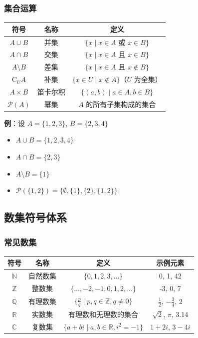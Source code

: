 \documentclass[12pt,a4paper,UTF8]{ctexart}
\begin{document}
\subsubsection{集合运算}

\begin{table}[ht]
\centering
\begin{tabular}{|c|c|c|}
\hline
符号 & 名称 & 定义 \\
\hline
$A \cup B$ & 并集 & $\{x \mid x \in A \text{ 或 } x \in B\}$ \\
\hline
$A \cap B$ & 交集 & $\{x \mid x \in A \text{ 且 } x \in B\}$ \\
\hline
$A \setminus B$ & 差集 & $\{x \mid x \in A \text{ 且 } x \notin B\}$ \\
\hline
$\mathrm{C}_U A$ & 补集 & $\{x \in U \mid x \notin A\}$（$U$ 为全集） \\
\hline
$A \times B$ & 笛卡尔积 & $\{(a,b) \mid a \in A, b \in B\}$ \\
\hline
$\mathcal{P}(A)$ & 幂集 & $A$ 的所有子集构成的集合 \\
\hline
\end{tabular}
\end{table}

\textbf{例}：设 $A = \{1,2,3\}$, $B = \{2,3,4\}$
\begin{itemize}
    \item $A \cup B = \{1,2,3,4\}$
    \item $A \cap B = \{2,3\}$
    \item $A \setminus B = \{1\}$
    \item $\mathcal{P}(\{1,2\}) = \{\emptyset, \{1\}, \{2\}, \{1,2\}\}$
\end{itemize}

\subsection{数集符号体系}

\subsubsection{常见数集}

\begin{table}[ht]
\centering
\begin{tabular}{|c|c|c|c|}
\hline
符号 & 名称 & 定义 & 示例元素 \\
\hline
$\mathbb{N}$ & 自然数集 & $\{0,1,2,3,\dots\}$ & 0, 1, 42 \\
\hline
$\mathbb{Z}$ & 整数集 & $\{\dots,-2,-1,0,1,2,\dots\}$ & -3, 0, 7 \\
\hline
$\mathbb{Q}$ & 有理数集 & $\{\frac{p}{q} \mid p,q \in \mathbb{Z}, q \neq 0\}$ & $\frac{1}{2}$, $-\frac{3}{4}$, 2 \\
\hline
$\mathbb{R}$ & 实数集 & 有理数和无理数的集合 & $\sqrt{2}$, $\pi$, 3.14 \\
\hline
$\mathbb{C}$ & 复数集 & $\{a+bi \mid a,b \in \mathbb{R}, i^2=-1\}$ & $1+2i$, $3-4i$ \\
\hline
\end{tabular}
\end{table}
\end{document}
